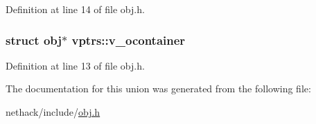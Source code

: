 Definition at line 14 of file obj.\+h.

\hypertarget{unionvptrs_a7d2dfe2fb22bf3aa653217c7ca691553}{
\subsubsection[{v\+\_\+ocontainer}]{\setlength{\rightskip}{0pt plus 5cm}struct {\bf obj}$\ast$ vptrs\+::v\+\_\+ocontainer}}\label{unionvptrs_a7d2dfe2fb22bf3aa653217c7ca691553}


Definition at line 13 of file obj.\+h.



The documentation for this union was generated from the following file\+:\begin{DoxyCompactItemize}
\item 
nethack/include/\hyperlink{obj_8h}{obj.\+h}\end{DoxyCompactItemize}
